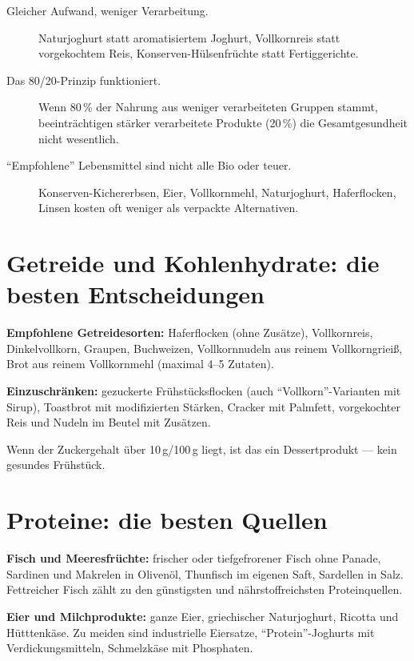 \documentclass[a5paper,12pt,oneside,openany]{book}
\newcommand{\boxgelb}[2]{%
  \begin{tcolorbox}[kastenbase,
    colback=gelb!12!white, colframe=gelb!80!black, title={#1}]
  #2\end{tcolorbox}}
\begin{document}
\begin{description}
  \item[Gleicher Aufwand, weniger Verarbeitung.] Naturjoghurt statt
    aromatisiertem Joghurt, Vollkornreis statt vorgekochtem Reis,
    Konserven-H\"{u}lsenfr\"{u}chte statt Fertiggerichte.
  \item[Das 80/20-Prinzip funktioniert.] Wenn 80\,\% der Nahrung aus weniger
    verarbeiteten Gruppen stammt, beeintr\"{a}chtigen st\"{a}rker verarbeitete
    Produkte (20\,\%) die Gesamtgesundheit nicht wesentlich.
  \item[``Empfohlene'' Lebensmittel sind nicht alle Bio oder teuer.]
    Konserven-Kichererbsen, Eier, Vollkornmehl, Naturjoghurt, Haferflocken,
    Linsen kosten oft weniger als verpackte Alternativen.
\end{description}

\section{Getreide und Kohlenhydrate: die besten Entscheidungen}

\textbf{Empfohlene Getreidesorten:} Haferflocken (ohne Zus\"{a}tze),
Vollkornreis, Dinkelvollkorn, Graupen, Buchweizen, Vollkornnudeln aus reinem
Vollkorngriei{\ss}, Brot aus reinem Vollkornmehl (maximal 4--5 Zutaten).

\textbf{Einzuschr\"{a}nken:} gezuckerte Fr\"{u}hst\"{u}cksflocken (auch
``Vollkorn''-Varianten mit Sirup), Toastbrot mit modifizierten St\"{a}rken,
Cracker mit Palmfett, vorgekochter Reis und Nudeln im Beutel mit Zus\"{a}tzen.

\boxgelb{Schnelltipp}{Wenn der Zuckergehalt \"{u}ber 10\,g/100\,g liegt, ist
das ein Dessertprodukt --- kein gesundes Fr\"{u}hst\"{u}ck.}

\section{Proteine: die besten Quellen}

\textbf{Fisch und Meeresfr\"{u}chte:} frischer oder tiefgefrorener Fisch
ohne Panade, Sardinen und Makrelen in Oliven\"{o}l, Thunfisch im eigenen
Saft, Sardellen in Salz. Fettreicher Fisch z\"{a}hlt zu den g\"{u}nstigsten
und n\"{a}hrstoffreichsten Proteinquellen.

\textbf{Eier und Milchprodukte:} ganze Eier, griechischer Naturjoghurt,
Ricotta und H\"{u}tttenk\"{a}se. Zu meiden sind industrielle Eiersatze,
``Protein''-Joghurts mit Verdickungsmitteln, Schmelzk\"{a}se mit Phosphaten.
\end{document}
